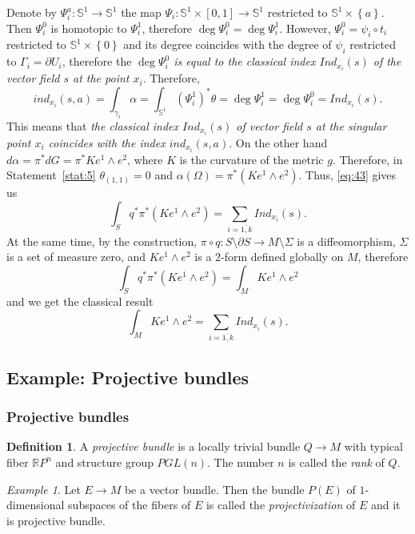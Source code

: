 \documentclass[12pt,letterpaper]{amsart}
\theoremstyle{definition}
\newtheorem{df}{Definition}
\theoremstyle{plain}
\theoremstyle{remark}
\newtheorem{ex}{Example}
\begin{document}
Denote by $\Psi^a_i : \mathbb{S}^1 \to \mathbb{S}^1$ the map $\Psi_i : \mathbb{S}^1 \times [0, 1] \to \mathbb{S}^1$ restricted to $\mathbb{S}^1 \times \left\{ a \right\}$.
Then $\Psi^0_i$ is homotopic to $\Psi^1_i$, therefore $\deg \Psi^0_i = \deg \Psi^1_i$.
However, $\Psi^0_i = \psi_i \circ t_i$ restricted to $\mathbb{S}^1 \times \left\{ 0 \right\}$ and its degree coincides with the degree of $\psi_i$ restricted to $\Gamma_i = \partial U_i$, therefore
the \emph{$\deg\Psi^0_i$ is equal to the classical index $Ind_{x_i}(s)$ of the vector field $s$ at the point $x_i$}.
Therefore,
\begin{equation}
ind_{x_i}(s, a) = \int_{\gamma_i} \alpha = \int_{\mathbb{S}^1} (\Psi^1_i)^* \theta = \deg \Psi^1_i = \deg \Psi^0_i = Ind_{x_i}(s).
\label{eq:43}
\end{equation}
This means that \emph{the classical index $Ind_{x_i}(s)$ of vector field $s$ at the singular point $x_i$ coincides with the index $ind_{x_i}(s, a)$}.
On the other hand $d\alpha = \pi^* dG = \pi^* K e^1 \wedge e^2$, where $K$ is the curvature of the metric $g$.
Therefore, in Statement~\ref{stat:5} $\theta_{(1, 1)} = 0$ and $\alpha(\Omega) = \pi^*(K e^1 \wedge e^2)$.
Thus, \eqref{eq:43} gives us
\begin{equation}
\int_S q^*\pi^*(K e^1 \wedge e^2) = \sum_{i = \overline{1, k}} Ind_{x_i}(s).
\label{eq:44}
\end{equation}
At the same time, by the construction, $\pi \circ q : S \setminus \partial S \to M \setminus \Sigma$ is a diffeomorphism, $\Sigma$ is a set of measure zero, and $K e^1 \wedge e^2$ is a $2$-form defined globally on $M$, therefore
\begin{equation}
\int_S q^*\pi^*(K e^1 \wedge e^2) = \int_M K e^1 \wedge e^2
\label{eq:45}
\end{equation}
and we get the classical result
\begin{equation}
\int_M K e^1 \wedge e^2 = \sum_{i = \overline{1, k}} Ind_{x_i}(s).
\label{eq:46}
\end{equation}

\subsection{Example: Projective bundles}
\label{subsec:4_2}
\subsubsection{Projective bundles}
\label{subsubsec:4_2_1}
\begin{df}
A \emph{projective bundle} is a locally trivial bundle $Q \to M$ with typical fiber $\mathbb{R}P^n$ and structure group $PGL(n)$.
The number $n$ is called the \emph{rank} of $Q$.
\label{df:3}
\end{df}
\begin{ex}
Let $E \to M$ be a vector bundle.
Then the bundle $P(E)$ of $1$-dimensional subspaces of the fibers of $E$ is called the \emph{projectivization} of $E$ and it is projective bundle.
\label{ex:4}
\end{ex}
\end{document}
